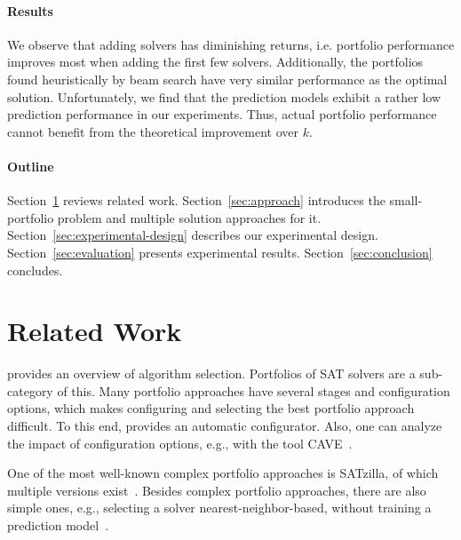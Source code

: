 \documentclass[conference]{IEEEtran}
\begin{document}
\paragraph{Results}

We observe that adding solvers has diminishing returns, i.e. portfolio performance improves most when adding the first few solvers.
Additionally, the portfolios found heuristically by beam search have very similar performance as the optimal solution.
Unfortunately, we find that the prediction models exhibit a rather low prediction performance in our experiments.
Thus, actual portfolio performance cannot benefit from the theoretical improvement over $k$.

\paragraph{Outline}

Section~\ref{sec:related-work} reviews related work.
Section~\ref{sec:approach} introduces the small-portfolio problem and multiple solution approaches for it.
Section~\ref{sec:experimental-design} describes our experimental design.
Section~\ref{sec:evaluation} presents experimental results.
Section~\ref{sec:conclusion} concludes.

\section{Related Work}
\label{sec:related-work}


\cite{kerschke2019automated} provides an overview of algorithm selection.
Portfolios of SAT solvers are a sub-category of this.
Many portfolio approaches have several stages and configuration options, which makes configuring and selecting the best portfolio approach difficult.
To this end, \cite{lindauer2015autofolio} provides an automatic configurator.
Also, one can analyze the impact of configuration options, e.g., with the tool CAVE~\cite{biedenkapp2018cave}.

One of the most well-known complex portfolio approaches is SATzilla, of which multiple versions exist~\cite{xu2008satzilla, xu2012satzilla2012}.
Besides complex portfolio approaches, there are also simple ones, e.g., selecting a solver nearest-neighbor-based, without training a prediction model~\cite{malitsky2011non, nikolic2013simple, samulowitz2013snappy}.
\end{document}
